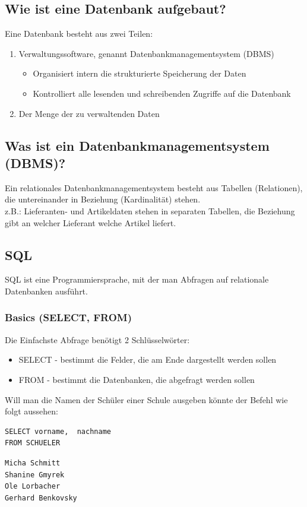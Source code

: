 \documentclass[10pt]{article}
\begin{document}
\subsection{Wie ist eine Datenbank aufgebaut?}
Eine Datenbank besteht aus zwei Teilen: \\
\begin{enumerate}
\item Verwaltungssoftware, genannt Datenbankmanagementsystem (DBMS) \\
\begin{itemize}
\item Organisiert intern die strukturierte Speicherung der Daten
\item Kontrolliert alle lesenden und schreibenden Zugriffe auf die Datenbank
\end{itemize}
\item Der Menge der zu verwaltenden Daten
\end{enumerate}

\subsection{Was ist ein Datenbankmanagementsystem (DBMS)?}
Ein relationales Datenbankmanagementsystem besteht aus Tabellen (Relationen), die untereinander in Beziehung (Kardinalität) stehen. \\
z.B.: Lieferanten- und Artikeldaten stehen in separaten Tabellen, die Beziehung gibt an welcher Lieferant welche Artikel liefert.

\subsection{SQL}

SQL ist eine Programmiersprache, mit der man Abfragen auf relationale Datenbanken ausführt.

\subsubsection{Basics (SELECT, FROM)}
Die Einfachste Abfrage benötigt 2 Schlüsselwörter:
\begin{itemize}
\item SELECT - bestimmt die Felder, die am Ende dargestellt werden sollen
\item FROM - bestimmt die Datenbanken, die abgefragt werden sollen \\
\end{itemize}
Will man die Namen der Schüler einer Schule ausgeben könnte der Befehl wie folgt aussehen: 
\begin{lstlisting}
SELECT vorname,  nachname 
FROM SCHUELER
\end{lstlisting}
\begin{verbatim}
Micha Schmitt
Shanine Gmyrek
Ole Lorbacher
Gerhard Benkovsky
\end{verbatim}
\end{document}
